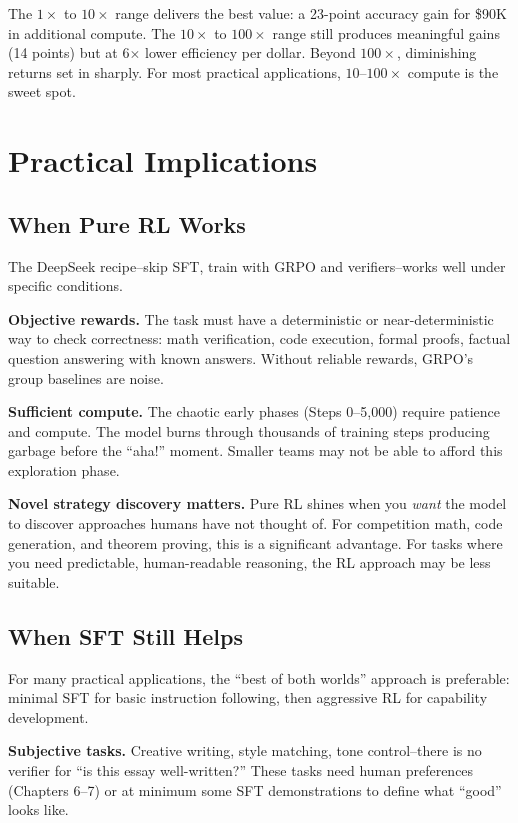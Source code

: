 \begin{chapterenv}
The $1\times$ to $10\times$ range delivers the best value: a 23-point accuracy gain for \$90K in additional compute. The $10\times$ to $100\times$ range still produces meaningful gains (14 points) but at 6$\times$ lower efficiency per dollar. Beyond $100\times$, diminishing returns set in sharply. For most practical applications, $10$--$100\times$ compute is the sweet spot.

\section{Practical Implications}

\subsection{When Pure RL Works}

The DeepSeek recipe--skip SFT, train with GRPO and verifiers--works well under specific conditions.

\textbf{Objective rewards.} The task must have a deterministic or near-deterministic way to check correctness: math verification, code execution, formal proofs, factual question answering with known answers. Without reliable rewards, GRPO's group baselines are noise.

\textbf{Sufficient compute.} The chaotic early phases (Steps 0--5,000) require patience and compute. The model burns through thousands of training steps producing garbage before the ``aha!'' moment. Smaller teams may not be able to afford this exploration phase.

\textbf{Novel strategy discovery matters.} Pure RL shines when you \textit{want} the model to discover approaches humans have not thought of. For competition math, code generation, and theorem proving, this is a significant advantage. For tasks where you need predictable, human-readable reasoning, the RL approach may be less suitable.

\subsection{When SFT Still Helps}

For many practical applications, the ``best of both worlds'' approach is preferable: minimal SFT for basic instruction following, then aggressive RL for capability development.

\textbf{Subjective tasks.} Creative writing, style matching, tone control--there is no verifier for ``is this essay well-written?'' These tasks need human preferences (Chapters 6--7) or at minimum some SFT demonstrations to define what ``good'' looks like.


\end{chapterenv}
